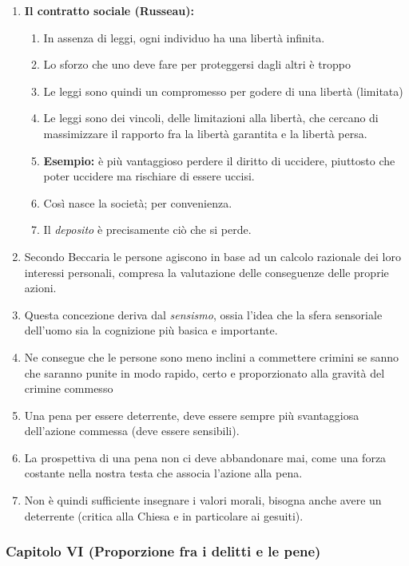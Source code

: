 \documentclass{article}
\begin{document}
\begin{enumerate}
    \item \textbf{Il contratto sociale (Russeau):}
    \begin{enumerate}
        \item In assenza di leggi, ogni individuo ha una libertà infinita.
        \item Lo sforzo che uno deve fare per proteggersi dagli altri è troppo
        \item Le leggi sono quindi un compromesso per godere di una libertà (limitata)
        \item Le leggi sono dei vincoli, delle limitazioni alla libertà, che cercano di massimizzare il rapporto fra la libertà garantita e la libertà persa.
        \item \textbf{Esempio:} è più vantaggioso perdere il diritto di uccidere, piuttosto che poter uccidere ma rischiare di essere uccisi.
        \item Così nasce la società; per convenienza.
        \item Il \textit{deposito} è precisamente ciò che si perde.
    \end{enumerate}
    \item Secondo Beccaria le persone agiscono in base ad un calcolo razionale dei loro interessi personali, compresa la valutazione delle conseguenze delle proprie azioni.
    \item Questa concezione deriva dal \textit{sensismo}, ossia l'idea che la sfera sensoriale dell'uomo sia la cognizione più basica e importante.
    \item Ne consegue che le persone sono meno inclini a commettere crimini se sanno che saranno punite in modo rapido, certo e proporzionato alla gravità del crimine commesso
    \item Una pena per essere deterrente, deve essere sempre più svantaggiosa dell'azione commessa (deve essere sensibili).
    \item La prospettiva di una pena non ci deve abbandonare mai, come una forza costante nella nostra testa che associa l'azione alla pena.
    \item Non è quindi sufficiente insegnare i valori morali, bisogna anche avere un deterrente (critica alla Chiesa e in particolare ai gesuiti).
\end{enumerate}

\newpage
\subsubsection{Capitolo VI (Proporzione fra i delitti e le pene)}
\end{document}
